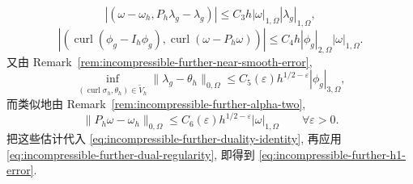 \begin{Proof}
\[\]
\[
|(\omega-\omega_h,P_h\lambda_g-\lambda_g)|
\leq C_3h|\omega|_{1,\Omega}|\lambda_g|_{1,\Omega},
\]
\[
|(\operatorname{curl}(\phi_g-I_h\phi_g),
\operatorname{curl}(\omega-P_h\omega))|
\leq C_4h|\phi_g|_{2,\Omega}|\omega|_{1,\Omega}.
\]
又由 Remark~\ref{rem:incompressible-further-near-smooth-error},
\[
\inf_{(\operatorname{curl}\sigma_h,\theta_h)\in\widetilde V_h}
\|\lambda_g-\theta_h\|_{0,\Omega}
\leq C_5(\varepsilon)h^{1/2-\varepsilon}|\phi_g|_{3,\Omega},
\]
而类似地由 Remark~\ref{rem:incompressible-further-alpha-two},
\[
\|P_h\omega-\omega_h\|_{0,\Omega}
\leq C_6(\varepsilon)h^{1/2-\varepsilon}|\omega|_{1,\Omega}
\qquad\forall\varepsilon>0.
\]
把这些估计代入
\eqref{eq:incompressible-further-duality-identity},
再应用 \eqref{eq:incompressible-further-dual-regularity},
即得到 \eqref{eq:incompressible-further-h1-error}.
\end{Proof}

